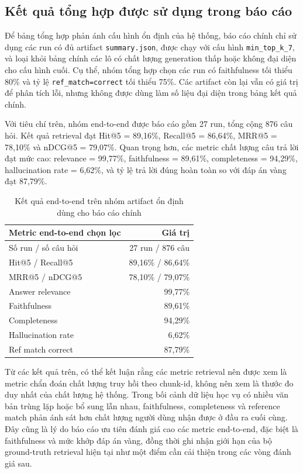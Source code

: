 \subsection{Kết quả tổng hợp được sử dụng trong báo cáo}

Để bảng tổng hợp phản ánh cấu hình ổn định của hệ thống, báo cáo chính chỉ sử
dụng các run có đủ artifact \texttt{summary.json}, được chạy với cấu hình
\texttt{min\_top\_k\_7}, và loại khỏi bảng chính các lô có chất lượng generation
thấp hoặc không đại diện cho cấu hình cuối. Cụ thể, nhóm tổng hợp chọn các run
có faithfulness tối thiểu 80\% và tỷ lệ \texttt{ref\_match=correct} tối thiểu
75\%. Các artifact còn lại vẫn có giá trị để phân tích lỗi, nhưng không được
dùng làm số liệu đại diện trong bảng kết quả chính.

Với tiêu chí trên, nhóm end-to-end được báo cáo gồm 27 run, tổng cộng 876 câu
hỏi. Kết quả retrieval đạt Hit@5 = 89,16\%, Recall@5 = 86,64\%, MRR@5 =
78,10\% và nDCG@5 = 79,07\%. Quan trọng hơn, các metric chất lượng câu trả lời
đạt mức cao: relevance = 99,77\%, faithfulness = 89,61\%, completeness =
94,29\%, hallucination rate = 6,62\%, và tỷ lệ trả lời đúng hoàn toàn so với
đáp án vàng đạt 87,79\%.

\begin{table}[H]
\centering
\small
\begin{tabular}{|p{5.1cm}|r|}
\hline
\textbf{Metric end-to-end chọn lọc} & \textbf{Giá trị} \\
\hline
Số run / số câu hỏi & 27 run / 876 câu \\
\hline
Hit@5 / Recall@5 & 89,16\% / 86,64\% \\
\hline
MRR@5 / nDCG@5 & 78,10\% / 79,07\% \\
\hline
Answer relevance & 99,77\% \\
\hline
Faithfulness & 89,61\% \\
\hline
Completeness & 94,29\% \\
\hline
Hallucination rate & 6,62\% \\
\hline
Ref match correct & 87,79\% \\
\hline
\end{tabular}
\caption{Kết quả end-to-end trên nhóm artifact ổn định dùng cho báo cáo chính}
\end{table}

Từ các kết quả trên, có thể kết luận rằng các metric retrieval nên được xem là
metric chẩn đoán chất lượng truy hồi theo chunk-id, không nên xem là thước đo
duy nhất của chất lượng hệ thống. Trong bối cảnh dữ liệu học vụ có nhiều văn
bản trùng lặp hoặc bổ sung lẫn nhau, faithfulness, completeness và reference
match phản ánh sát hơn chất lượng người dùng nhận được ở đầu ra cuối cùng. Đây
cũng là lý do báo cáo ưu tiên đánh giá cao các metric end-to-end, đặc biệt là
faithfulness và mức khớp đáp án vàng, đồng thời ghi nhận giới hạn của bộ
ground-truth retrieval hiện tại như một điểm cần cải thiện trong các vòng đánh
giá sau.
